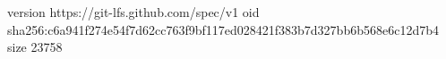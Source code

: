version https://git-lfs.github.com/spec/v1
oid sha256:c6a941f274e54f7d62cc763f9bf117ed028421f383b7d327bb6b568e6c12d7b4
size 23758
